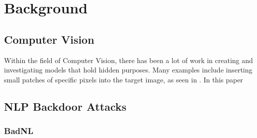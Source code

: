 \chapter{Background}

\section{Computer Vision}

Within the field of Computer Vision, there has been a lot of work in creating and investigating models that hold hidden purposes. Many examples include inserting small
patches of specific pixels into the target image, as seen in \cite{DBLP}. In this paper

\section{NLP Backdoor Attacks}

\subsection{BadNL}
